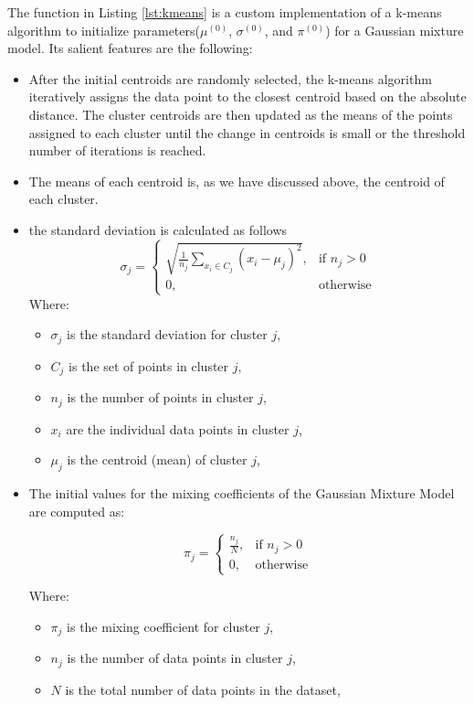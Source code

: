 \documentclass[]{article}
\begin{document}
The function in Listing \ref{lst:kmeans} is a custom implementation of a k-means algorithm to initialize parameters($\mu^{(0)}$, $\sigma^{(0)}$, and $\pi^{(0)}$) for a Gaussian mixture model. Its salient features are the following:
\begin{itemize}
	\item After the initial centroids are randomly selected, the k-means algorithm iteratively assigns the data point to the closest centroid based on the absolute distance. The cluster centroids are then updated as the means of the points assigned to each cluster until the change in centroids is small or the threshold number of iterations is reached.
	\item The means of each centroid is, as we have discussed above, the centroid of each cluster.
	\item the standard deviation is calculated as follows
	$$
	\sigma_j =
	\begin{cases}
		\sqrt{\frac{1}{n_j} \sum_{x_i \in C_j} (x_i - \mu_j)^2}, & \text{if } n_j > 0 \\
		0, & \text{otherwise}
	\end{cases}
	$$
	Where:
	\begin{itemize}
		\item $\sigma_j$ is the standard deviation for cluster $j$,
		\item $C_j$ is the set of points in cluster $j$,
		\item $n_j$ is the number of points in cluster $j$,
		\item $x_i$ are the individual data points in cluster $j$,
		\item $\mu_j$ is the centroid (mean) of cluster $j$,
	\end{itemize}
	
	\item The initial values for the mixing coefficients of the Gaussian Mixture Model are computed as:
	
	$$
	\pi_j =
	\begin{cases}
		\frac{n_j}{N}, & \text{if } n_j > 0 \\
		0, & \text{otherwise}
	\end{cases}
	$$
	
	Where:
	\begin{itemize}
		\item $\pi_j$ is the mixing coefficient for cluster $j$,
		\item $n_j$ is the number of data points in cluster $j$,
		\item $N$ is the total number of data points in the dataset,
	\end{itemize}
	
\end{itemize}
\end{document}
